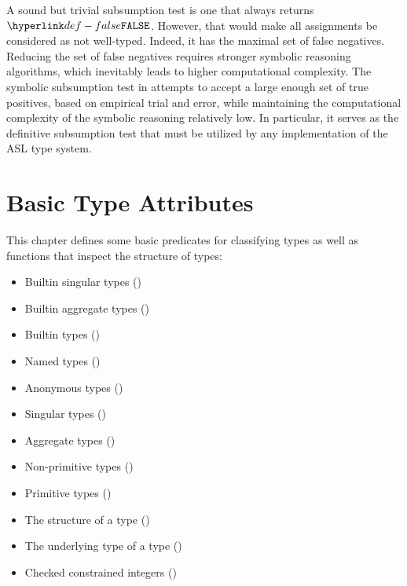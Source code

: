 \documentclass{book}
\begin{document}
A sound but trivial subsumption test is one that always returns $\False$.
However, that would make all assignments be considered as not well-typed.
Indeed, it has the maximal set of false negatives.
Reducing the set of false negatives requires stronger symbolic reasoning algorithms,
which inevitably leads to higher computational complexity.
%
The symbolic subsumption test in 
attempts to accept a large enough set of true positives, based on empirical trial and error,
while maintaining the computational complexity of the symbolic reasoning relatively low.
%
In particular, it serves as the definitive subsumption test that must be utilized
by any implementation of the ASL type system.

\chapter{Basic Type Attributes}

This chapter defines some basic predicates for classifying types as well as
functions that inspect the structure of types:
\begin{itemize}
  \item Builtin singular types ()
  \item Builtin aggregate types ()
  \item Builtin types ()
  \item Named types ()
  \item Anonymous types ()
  \item Singular types ()
  \item Aggregate types ()
  \item Non-primitive types ()
  \item Primitive types ()
  \item The structure of a type ()
  \item The underlying type of a type ()
  \item Checked constrained integers ()
\end{itemize}
\end{document}
